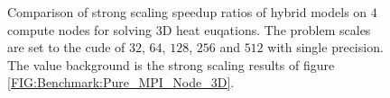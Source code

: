 \begin{figure}[htbp]
{    \label{FIG:Benchmark:FIG_Benchmark_hybrid_0_multi_nodes_3D}
  }
  \hspace{0em} 
  \caption{
      Comparison of strong scaling speedup ratios of hybrid models on $4$ compute nodes for solving 3D heat euqations.
      The problem scales are set to the cude of $32$, $64$, $128$, $256$ and $512$ with single precision.
      The value background is the strong scaling results of figure \ref{FIG:Benchmark:Pure_MPI_Node_3D}.
    }
  \label{FIG:Benchmark:Hybrid_Single_Four_Node_3D}
\end{figure}


